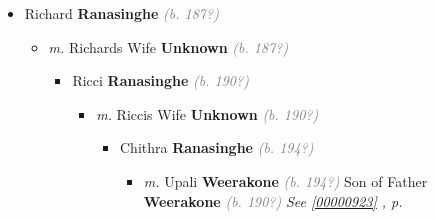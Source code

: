 \documentclass[10pt, openany]{book}
\begin{document}
\begin{itemize}
{\begin{itemize}
{\begin{itemize}
{\begin{itemize}
{\begin{itemize}
{\begin{itemize}
{   }
\item{Kankanige Oscar Perera \textbf{Nanayakkara} \textcolor{gray}{\textit{(b. 194?)}}
   }
\item{Kankanige Cyrus Perera \textbf{Nanayakkara} \textcolor{gray}{\textit{(b. 194?)}}
   }
\item{MyrtleSeneviratne \textbf{Nanayakkara} \textcolor{gray}{\textit{(b. 194?)}}
 }
\end{itemize}}
\end{itemize}
  }
\item{Alfred Vincent Perera \textbf{Samaranayake} \textcolor{gray}{\textit{(b. 190?)}}
   }
\item{Siyadoris Tabulate Perera \textbf{Samaranayake} \textcolor{gray}{\textit{(b. 190?)}}
   }
\end{itemize}}
\end{itemize}
 }
\item{Richard \textbf{Ranasinghe} \textcolor{gray}{\textit{(b. 187?)}}
\begin{itemize}
\item{\textit{m.} Richards Wife \textbf{Unknown} \textcolor{gray}{\textit{(b. 187?)}}   \label{couple:00000633:00000903} \begin{itemize}
\item{Ricci \textbf{Ranasinghe} \textcolor{gray}{\textit{(b. 190?)}}
\begin{itemize}
\item{\textit{m.} Riccis Wife \textbf{Unknown} \textcolor{gray}{\textit{(b. 190?)}}   \label{couple:00000632:00000902} \begin{itemize}
\item{Chithra \textbf{Ranasinghe} \textcolor{gray}{\textit{(b. 194?)}}
\begin{itemize}
\item{\textit{m.} Upali \textbf{Weerakone} \textcolor{gray}{\textit{(b. 194?)}} Son of  Father \textbf{Weerakone} \textcolor{gray}{\textit{(b. 190?)}} \textcolor{slteal}{\textit{See  \autoref{00000923} \textit{, p. \pageref{00000923} }}}   \label{couple:00000623:00000932} \begin{itemize}

\end{itemize}}
\end{itemize}}
\end{itemize}}
\end{itemize}}
\end{itemize}}
\end{itemize}}
\end{itemize}}
\end{itemize}
\end{document}
